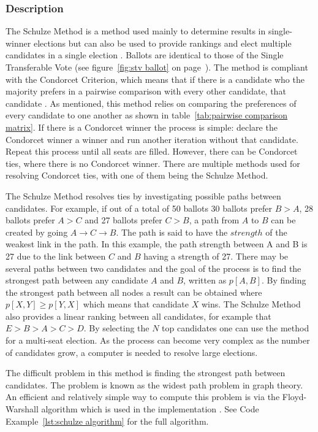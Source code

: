 \documentclass[12pt]{article}
\begin{document}
\subsubsection{Description}
The Schulze Method is a method used mainly to determine results in single-winner elections but can also be used to provide rankings and elect multiple candidates in a single election \autocite{Schulze2011}. Ballots are identical to those of the Single Transferable Vote (see figure~\ref{fig:stv ballot} on page~\pageref{fig:stv ballot}). The method is compliant with the Condorcet Criterion, which means that if there is a candidate who the majority prefers in a pairwise comparison with every other candidate, that candidate  \autocite{johnson2005}. As mentioned, this method relies on comparing the preferences of every candidate to one another as shown in table~\ref{tab:pairwise comparison matrix}. If there is a Condorcet winner the process is simple: declare the Condorcet winner a winner and run another iteration without that candidate. Repeat this process until all seats are filled. However, there can be Condorcet ties, where there is no Condorcet winner. There are multiple methods used for resolving Condorcet ties, with one of them being the Schulze Method.

The Schulze Method resolves ties by investigating possible paths between candidates. For example, if out of a total of 50 ballots 30 ballots prefer $B>A$, 28 ballots prefer $A>C$ and 27 ballots prefer $C>B$, a path from $A$ to $B$ can be created by going $A \rightarrow C \rightarrow B$. The path is said to have the $strength$ of the weakest link in the path. In this example, the path strength between A and B is 27 due to the link between $C$ and $B$ having a strength of 27. There may be several paths between two candidates and the goal of the process is to find the strongest path between any candidate $A$ and $B$, written as $p[A,B]$. By finding the strongest path between all nodes a result can be obtained where $p[X,Y] \geq p[Y,X]$ which means that candidate $X$ wins. The Schulze Method also provides a linear ranking between all candidates, for example that $E > B > A > C > D$. By selecting the $N$ top candidates one can use the method for a multi-seat election. As the process can become very complex as the number of candidates grow, a computer is needed to resolve large elections.

The difficult problem in this method is finding the strongest path between candidates. The problem is known as the widest path problem in graph theory. An efficient and relatively simple way to compute this problem is via the Floyd-Warshall algorithm which is used in the implementation \autocite{wikipedia2017warshall}. See Code Example~\ref{lst:schulze algorithm} for the full algorithm.
\end{document}
